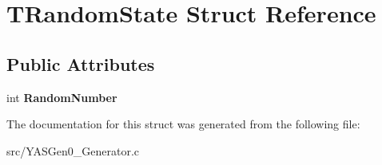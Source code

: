 \hypertarget{struct_t_random_state}{}\section{T\+Random\+State Struct Reference}
\label{struct_t_random_state}
\subsection*{Public Attributes}
\begin{DoxyCompactItemize}
\item 
\mbox{\label{struct_t_random_state_ae3aeb02e37d662152f2106ef898d2cce}} 
int {\bfseries Random\+Number}
\end{DoxyCompactItemize}


The documentation for this struct was generated from the following file\+:\begin{DoxyCompactItemize}
\item 
src/Y\+A\+S\+Gen0\+\_\+\+Generator.\+c\end{DoxyCompactItemize}
